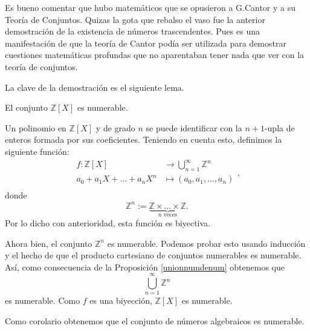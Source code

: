 Es bueno comentar que hubo matemáticos  que se opusieron a
G.Cantor y a su Teoría de Conjuntos. Quizas la gota que
rebalso el vaso fue la anterior demostración de la existencia
de números trascendentes. Pues es una manifestación de que la 
teoría de Cantor podía ser utilizada para demostrar cuestiones 
matemáticas profundas que no aparentaban tener nada que ver con
la teoría de conjuntos.

La clave de la demostración es el siguiente lema.

\begin{lema}{} El conjunto $\mathbb{Z}[X]$ es numerable.
\end{lema}
\begin{demo} Un polinomio  en $\mathbb{Z}[X]$ y de grado $n$ se puede
identificar con la $n+1$-upla de enteros formada por sus
coeficientes. Teniendo en cuenta esto, definimos la siguiente
función:
\[\begin{split}
          f:\mathbb{Z}[X]&\longrightarrow
            \bigcup_{n=1}^{\infty}\mathbb{Z}^n\\
            a_0+a_1X+\dots+a_nX^n&\longmapsto (a_0,a_1,\dots,
            a_n)\\
            \end{split},
\]
donde
\[\mathbb{Z}^n:=\underbrace{\mathbb{Z}\times\dots\times\mathbb{Z}}_{n\,\,\text{veces}}.\]
Por lo dicho con anterioridad, esta función es biyectiva.

Ahora bien, el conjunto $\mathbb{Z}^n$ es numerable. Podemos
probar esto usando inducción y el hecho de que el producto
cartesiano de conjuntos numerables es numerable. Así, como
consecuencia de la Proposición \vref{unionnumdenum} obtenemos
que
\[\bigcup_{n=1}^{\infty}\mathbb{Z}^n\]
es numerable. Como $f$ es una biyección, $\mathbb{Z}[X]$ es
numerable.
\end{demo}

Como corolario obtenemos que el conjunto de números algebraicos
es numerable.

